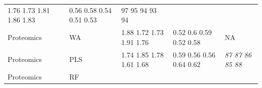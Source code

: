 \documentclass[utf8]{frontiersHLTH} %
\begin{document}
\begin{longtable}[]{@{}lllll@{}}
\begin{minipage}[t]{0.19\columnwidth}
1.76 1.73 1.81 1.86 1.83\strut
\end{minipage} & \begin{minipage}[t]{0.19\columnwidth}\raggedright\strut
0.56 0.58 0.54 0.51 0.53\strut
\end{minipage} & \begin{minipage}[t]{0.27\columnwidth}\raggedright\strut
97 95 94 93 94\strut
\end{minipage}\tabularnewline
\begin{minipage}[t]{0.13\columnwidth}\raggedright\strut
Proteomics\strut
\end{minipage} & \begin{minipage}[t]{0.08\columnwidth}\raggedright\strut
WA\strut
\end{minipage} & \begin{minipage}[t]{0.19\columnwidth}\raggedright\strut
1.88 1.72 1.73 1.91 1.76\strut
\end{minipage} & \begin{minipage}[t]{0.19\columnwidth}\raggedright\strut
0.52 0.6 0.59 0.52 0.58\strut
\end{minipage} & \begin{minipage}[t]{0.27\columnwidth}\raggedright\strut
NA\strut
\end{minipage}\tabularnewline
\begin{minipage}[t]{0.13\columnwidth}\raggedright\strut
Proteomics\strut
\end{minipage} & \begin{minipage}[t]{0.08\columnwidth}\raggedright\strut
PLS\strut
\end{minipage} & \begin{minipage}[t]{0.19\columnwidth}\raggedright\strut
1.74 1.85 1.78 1.61 1.68\strut
\end{minipage} & \begin{minipage}[t]{0.19\columnwidth}\raggedright\strut
0.59 0.56 0.56 0.64 0.62\strut
\end{minipage} & \begin{minipage}[t]{0.27\columnwidth}\raggedright\strut
\emph{87 87 86 85 88}\strut
\end{minipage}\tabularnewline
\begin{minipage}[t]{0.13\columnwidth}\raggedright\strut
Proteomics\strut
\end{minipage} & \begin{minipage}[t]{0.08\columnwidth}\raggedright\strut
RF\strut
\end{minipage} & \begin{minipage}[t]{0.19\columnwidth}\raggedright\strut

\end{minipage}
\end{longtable}
\end{document}
